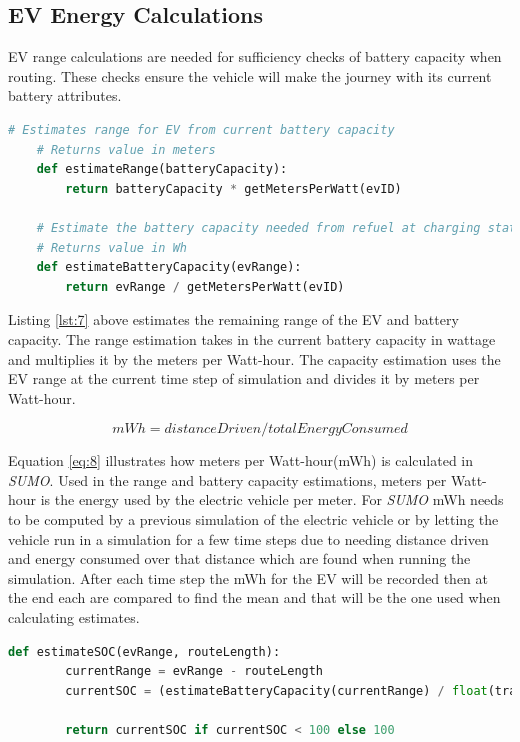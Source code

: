 \documentclass[11pt]{report}
\begin{document}
\subsection{EV Energy Calculations}

EV range calculations are needed for sufficiency checks of battery capacity when routing. These checks ensure the vehicle will make the journey with its current battery attributes. 

\begin{lstlisting}[language=Python, caption=Range estimation function, label={lst:7}]
    # Estimates range for EV from current battery capacity
    # Returns value in meters
    def estimateRange(batteryCapacity):
        return batteryCapacity * getMetersPerWatt(evID)
    
    # Estimate the battery capacity needed from refuel at charging station to get to destination
    # Returns value in Wh
    def estimateBatteryCapacity(evRange):
        return evRange / getMetersPerWatt(evID)
\end{lstlisting}

Listing \ref{lst:7} above estimates the remaining range of the EV and battery capacity. The range estimation takes in the current battery capacity in wattage and multiplies it by the meters per Watt-hour. The capacity estimation uses the EV range at the current time step of simulation and divides it by meters per Watt-hour.

\begin{equation} \label{eq:8}
    mWh=distanceDriven/totalEnergyConsumed
\end{equation}

Equation \ref{eq:8} illustrates how meters per Watt-hour(mWh) is calculated in \emph{SUMO}. Used in the range and battery capacity estimations, meters per Watt-hour is the energy used by the electric vehicle per meter. For \emph{SUMO} mWh needs to be computed by a previous simulation of the electric vehicle or by letting the vehicle run in a simulation for a few time steps due to needing distance driven and energy consumed over that distance which are found when running the simulation. After each time step the mWh for the EV will be recorded then at the end each are compared to find the mean and that will be the one used when calculating estimates. 

\begin{lstlisting}[language=Python, caption=Function to estimate State of Charge (SoC) of EV, label={lst:8}]
    def estimateSOC(evRange, routeLength):
        currentRange = evRange - routeLength
        currentSOC = (estimateBatteryCapacity(currentRange) / float(traci.vehicle.getParameter(evID, 'device.battery.maximumBatteryCapacity'))) * 100
        
        return currentSOC if currentSOC < 100 else 100
\end{lstlisting}
\end{document}
